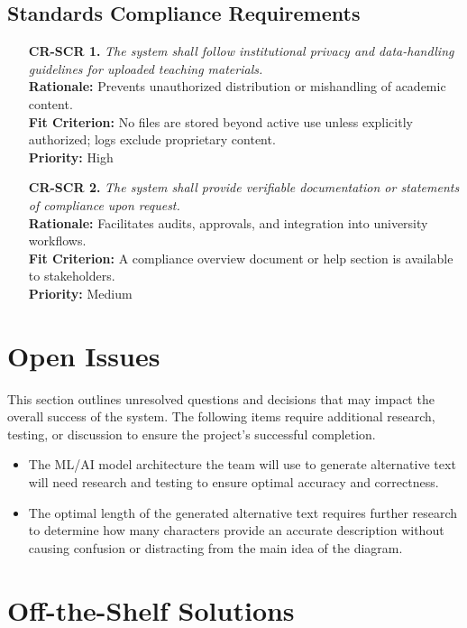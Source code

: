 \documentclass[12pt]{article}
\begin{document}
\subsection{Standards Compliance Requirements}
\begin{itemize}
  \item[\textbf{CR-SCR 1.}] \textit{The system shall follow
      institutional privacy and data-handling guidelines for uploaded
    teaching materials.}\\
    \textbf{Rationale:} Prevents unauthorized distribution or
    mishandling of academic content.\\
    \textbf{Fit Criterion:} No files are stored beyond active use
    unless explicitly authorized; logs exclude proprietary content.\\
    \textbf{Priority:} High

  \item[\textbf{CR-SCR 2.}] \textit{The system shall provide verifiable
    documentation or statements of compliance upon request.}\\
    \textbf{Rationale:} Facilitates audits, approvals, and
    integration into university workflows.\\
    \textbf{Fit Criterion:} A compliance overview document or help
    section is available to stakeholders.\\
    \textbf{Priority:} Medium
\end{itemize}

\section{Open Issues}
This section outlines unresolved questions and decisions that may
impact the overall success of the system.
The following items require additional research, testing, or
discussion to ensure the project’s successful completion.
\begin{itemize}
  \item The ML/AI model architecture the team will use to generate
    alternative text will need research and testing
    to ensure optimal accuracy and correctness.
  \item The optimal length of the generated alternative text requires
    further research to determine how many characters provide an
    accurate description without causing confusion or distracting
    from the main idea of the diagram.
\end{itemize}

\section{Off-the-Shelf Solutions}
\end{document}
